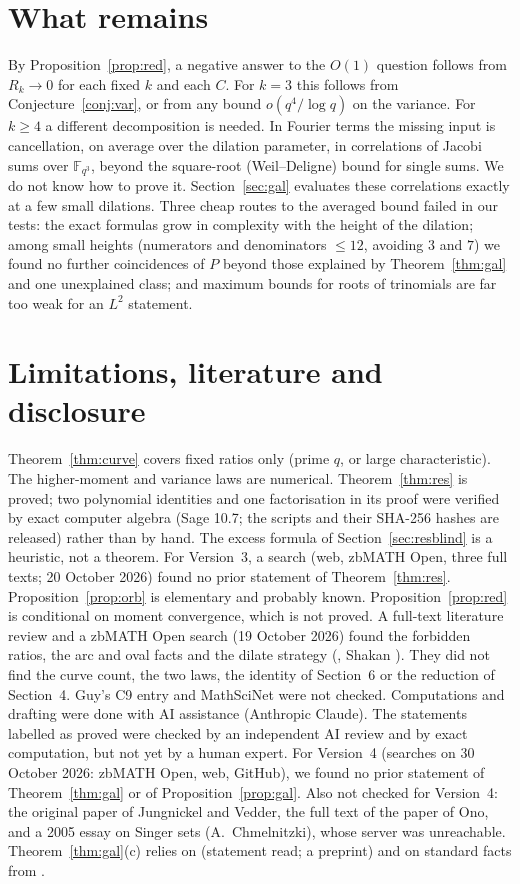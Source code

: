 \documentclass[11pt]{article}
\begin{document}
\section{What remains}\label{sec:rem}
By Proposition~\ref{prop:red}, a negative answer to the $O(1)$ question follows from $R_k\to0$ for each fixed $k$ and each $C$. For $k=3$ this follows
from Conjecture~\ref{conj:var}, or from any bound $o(q^4/\log q)$ on the variance. For $k\ge4$ a different decomposition is needed. In
Fourier terms the missing input is cancellation, on average over the dilation parameter, in correlations of Jacobi sums over
$\mathbb F_{q^3}$, beyond the square-root (Weil--Deligne) bound for single sums. We do not know how to prove it. Section~\ref{sec:gal} evaluates these correlations exactly at a few small dilations. Three cheap routes to the averaged bound failed in our tests: the exact formulas grow in complexity with the height of the dilation; among small heights (numerators and denominators $\le12$, avoiding $3$ and $7$) we found no further coincidences of $P$ beyond those explained by Theorem~\ref{thm:gal} and one unexplained class; and maximum bounds for roots of trinomials \cite{BCR} are far too weak for an $L^2$ statement.

\section{Limitations, literature and disclosure}\label{sec:lim}
Theorem~\ref{thm:curve} covers fixed ratios only (prime $q$, or large characteristic). The higher-moment and variance laws are
numerical. Theorem~\ref{thm:res} is proved; two polynomial identities and one factorisation in its proof were verified by exact computer algebra (Sage 10.7; the scripts and their SHA-256 hashes are released) rather than by hand. The excess formula of Section~\ref{sec:resblind} is a heuristic, not a theorem. For Version~3, a search (web, zbMATH Open, three full texts; 20 October 2026) found no prior statement of Theorem~\ref{thm:res}. Proposition~\ref{prop:orb} is elementary and probably known. Proposition~\ref{prop:red} is conditional on moment convergence, which is not proved. A full-text literature review and a
zbMATH Open search (19 October 2026) found the forbidden ratios, the arc and oval facts \cite{JV,Pi} and the dilate strategy
(\cite{Go}, Shakan \cite{Sh}). They did not find the curve count, the two laws, the identity of Section~6 or the reduction of
Section~4. Guy's C9 entry and MathSciNet were not checked. Computations and drafting were done with AI assistance (Anthropic Claude).
The statements labelled as proved were checked by an independent AI review and by exact computation, but not yet by a human expert. For Version~4 (searches on 30 October 2026: zbMATH Open, web, GitHub), we found no prior statement of Theorem~\ref{thm:gal} or of Proposition~\ref{prop:gal}. Also not checked for Version~4: the original paper of Jungnickel and Vedder, the full text of the paper of Ono, and a 2005 essay on Singer sets (A.~Chmelnitzki), whose server was unreachable. Theorem~\ref{thm:gal}(c) relies on \cite[Thm.~1.7]{BK} (statement read; a preprint) and on standard facts from \cite{IR}.
\end{document}
